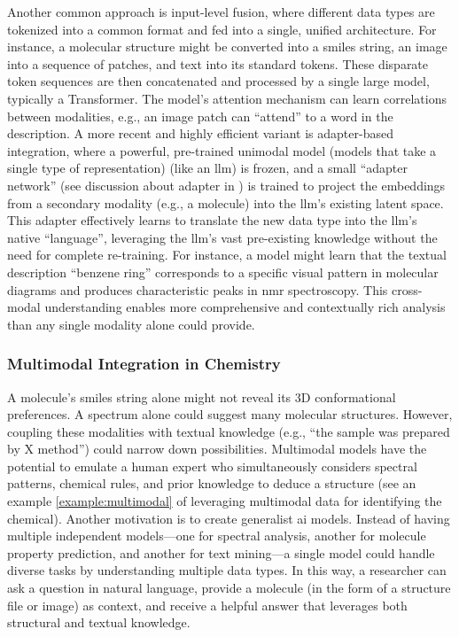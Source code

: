 Another common approach is input-level fusion, where different data types are tokenized into a common format and fed into a single, unified architecture. 
For instance, a molecular structure might be converted into a \gls{smiles} string, an image into a sequence of patches, and text into its standard tokens. These disparate token sequences are then concatenated and processed by a single large model, typically a Transformer.\autocite{xu2025qwen3} 
The model's attention mechanism can learn correlations between modalities, e.g., an image patch can \enquote{attend} to a word in the description.
A more recent and highly efficient variant is adapter-based integration, where a powerful, pre-trained unimodal model (models that take a single type of representation) (like an \gls{llm}) is frozen, and a small \enquote{adapter network} (see discussion about adapter in ) is trained to project the embeddings from a secondary modality (e.g., a molecule) into the \gls{llm}'s existing latent space.\autocite{liu2023multi} 
This adapter effectively learns to translate the new data type into the \gls{llm}'s native \enquote{language}, leveraging the \gls{llm}'s vast pre-existing knowledge without the need for complete re-training. 
For instance, a model might learn that the textual description \enquote{benzene ring} corresponds to a specific visual pattern in molecular diagrams and produces characteristic peaks in \gls{nmr} spectroscopy. 
This cross-modal understanding enables more comprehensive and contextually rich analysis than any single modality alone could provide.

\subsubsection{Multimodal Integration in Chemistry}\label{sec:multimodal_chem}

A molecule’s \gls{smiles} string alone might not reveal its 3D conformational preferences. 
A spectrum alone could suggest many molecular structures. 
However, coupling these modalities with textual knowledge (e.g., \enquote{the sample was prepared by X method}) could narrow down possibilities. 
Multimodal models have the potential to emulate a human expert who simultaneously considers spectral patterns, chemical rules, and prior knowledge to deduce a structure (see an example \ref{example:multimodal} of leveraging multimodal data for identifying the chemical). 
Another motivation is to create generalist \gls{ai} models. 
Instead of having multiple independent models---one for spectral analysis, another for molecule property prediction, and another for text mining---a single model could handle diverse tasks by understanding multiple data types.
In this way, a researcher can ask a question in natural language, provide a molecule (in the form of a structure file or image) as context, and receive a helpful answer that leverages both structural and textual knowledge.

